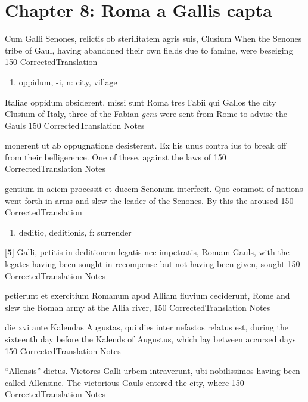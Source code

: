 \chapter*{Chapter 8:  Roma a Gallis capta} %
\label{sec:chapter_8}

\latline
  {Cum Galli Senones, relictis ob sterilitatem agris suis, Clusium}
  { When the Senones tribe of Gaul, having abandoned their own fields due to famine, were beseiging  }
  {150}
  { CorrectedTranslation }
  { \begin{enumerate}
  	\item oppidum, -i, n:  city, village
  \end{enumerate} }


\latline
  {Italiae oppidum obsiderent, missi sunt Roma tres Fabii qui Gallos}
  { the city Clusium of Italy, three of the Fabian \emph{gens} were sent from Rome to advise the Gauls }
  {150}
  { CorrectedTranslation }
  { Notes }


\latline
  {monerent ut ab oppugnatione desisterent.  Ex his unus contra ius}
  { to break off from their belligerence.  One of these, against the laws of  }
  {150}
  { CorrectedTranslation }
  { Notes }


\latline
  {gentium in aciem processit et ducem Senonum interfecit.  Quo commoti }
  { of nations went forth in arms and slew the leader of the Senones.  By this the aroused }
  {150}
  { CorrectedTranslation }
  { \begin{enumerate}
  	\item deditio, deditionis, f:  surrender
  \end{enumerate} }


\latline
  {[\textbf{5}] Galli, petitis in deditionem legatis nec impetratis, Romam}
  { Gauls, with the legates having been sought in recompense but not having been given, sought }
  {150}
  { CorrectedTranslation }
  { Notes }


\latline
  {petierunt et exercitium Romanum apud Alliam fluvium ceciderunt,}
  { Rome and slew the Roman army at the Allia river, }
  {150}
  { CorrectedTranslation }
  { Notes }


\latline
  {die xvi ante Kalendas Augustas, qui dies inter nefastos relatus est,}
  { during the sixteenth day before the Kalends of Augustus, which lay between accursed days }
  {150}
  { CorrectedTranslation }
  { Notes }


\latline
  {``Allensis'' dictus.  Victores Galli urbem intraverunt, ubi nobilissimos}
  { having been called Allensine.  The victorious Gauls entered the city, where  }
  {150}
  { CorrectedTranslation }
  { Notes }


